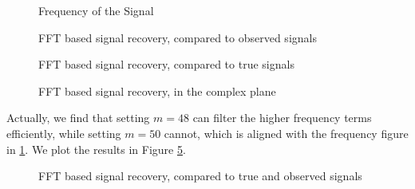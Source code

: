 \documentclass[conference,onecolumn,12pt]{IEEEtran}
\theoremstyle{definition}
\begin{document}
\begin{figure}
    \centering
    \resizebox{\textwidth}{!}{
    }
    \caption{Frequency of the Signal}
    \label{fig:freq}

\end{figure}

\begin{figure}
    \centering
    \resizebox{\textwidth}{!}{
    }
    \caption{FFT based signal recovery, compared to observed signals}    \label{fig:main2}

\end{figure}

\begin{figure}
    \centering
    \resizebox{\textwidth}{!}{
    }
    \caption{FFT based signal recovery, compared to true signals}    \label{fig:main3}

\end{figure}

\begin{figure}
    \centering
    \resizebox{\textwidth}{!}{
    }
    \caption{FFT based signal recovery, in the complex plane}    \label{fig:main}

\end{figure}



Actually, we find that setting $m=48$ can filter the higher frequency terms efficiently, while setting $m=50$ cannot, which is aligned with the frequency figure in \ref{fig:freq}. We plot the results in Figure \ref{fig:main4}.

\begin{figure}
    \centering
    \resizebox{\textwidth}{!}{
    }
    \caption{FFT based signal recovery, compared to true and observed signals}    \label{fig:main4}

\end{figure}
\end{document}

